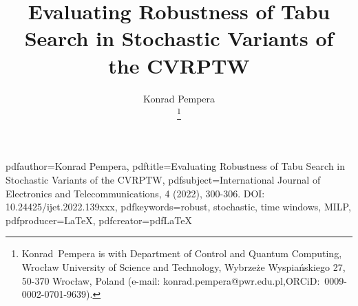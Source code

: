 \hypersetup
{pdfauthor={Konrad Pempera},%
pdftitle={Evaluating Robustness of Tabu Search in Stochastic Variants of the CVRPTW},%
pdfsubject={International Journal of Electronics and Telecommunications, 4 (2022), 300-306. DOI: 10.24425/ijet.2022.139xxx},%
pdfkeywords={robust, stochastic, time windows, MILP},%
pdfproducer={LaTeX},%
pdfcreator={pdfLaTeX}
}


%

\title{\vspace{1cm}Evaluating Robustness of Tabu Search in Stochastic Variants of the CVRPTW} 
%
%
%

\author{Konrad Pempera %
	
    \thanks{Konrad~Pempera is with Department of Control and Quantum Computing, Wrocław University of Science and Technology, Wybrzeże Wyspiańskiego 27, 50-370 Wrocław, Poland (e-mail: konrad.pempera@pwr.edu.pl,\linebreak{}ORCiD:~0009-0002-0701-9639).}%
}


%
%



